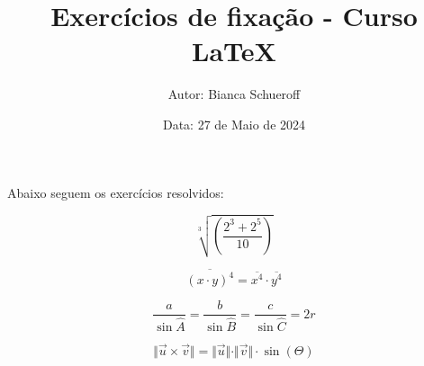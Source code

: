 \documentclass[a4paper, 12pt]{article}
\title{\textbf{Exercícios de fixação - Curso LaTeX}}
\author{Autor: Bianca Schueroff}
\date{Data: 27 de Maio de 2024}
\begin{document}
\maketitle

Abaixo seguem os exercícios resolvidos:

\begin{equation}
\sqrt[3]{\left(\frac{2^{3}+2^{5}}{10}\right)}
\end{equation}

\begin{equation}
\overline{(x\cdot y)^{4}}=\overline{x^{4}}\cdot\overline{y^{4}}
\end{equation}

\begin{equation}
\frac{a}{\sin\widehat{A}}=\frac{b}{\sin\widehat{B}}=\frac{c}{\sin\widehat{C}}=2r
\end{equation}

\begin{equation}
\Vert\vec{u}\times\vec{v}\Vert=\Vert\vec{u}\Vert\cdot\Vert\vec{v}\Vert\cdot\sin(\Theta)
\end{equation}
\end{document}
